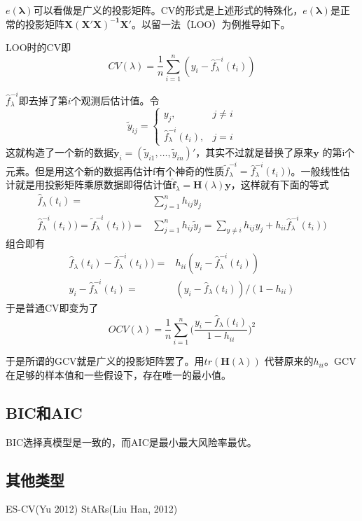 ﻿\documentclass[hyperref,12pt]{ctexart}
\begin{document}
$e(\boldsymbol{\lambda})$可以看做是广义的投影矩阵。CV的形式是上述形式的特殊化，$e(\boldsymbol{\lambda})$是正常的投影矩阵$\mathbf{X(X'X)^{-1}X'}$。以留一法（LOO）为例推导如下。

LOO时的CV即
\[
CV(\lambda) = \frac{1}{n}\sum_{i = 1}^n(y_i - \hat{f}_{\lambda}^{-i}(t_i))
\]

$\hat{f}_{\lambda}^{-i}$即去掉了第$i$个观测后估计值。令
\[
\tilde{y}_{ij} = \left\{\begin{array}{lr}
y_j, & j \neq i \\
\hat{f}_{\lambda}^{-i}(t_i), & j = i
\end{array}\right.
\]
这就构造了一个新的数据$\tilde{\mathbf{y}}_i = (\tilde{y}_{i1}, \ldots, \tilde{y}_{in})'$，其实不过就是替换了原来$\mathbf{y}$ 的第i个元素。但是用这个新的数据再估计f有个神奇的性质$\tilde{f}_{\lambda}^{-i} = \hat{f}_{\lambda}^{-i}(t_i))$。一般线性估计就是用投影矩阵乘原数据即得估计值$\hat{\mathbf{f}}_{\lambda} = \mathbf{H}(\lambda)\mathbf{y}$，这样就有下面的等式
\[
\begin{split}
\hat{f}_{\lambda}(t_i) = & \sum_{j = 1}^n h_{ij}y_j \\
\hat{f}_{\lambda}^{-i}(t_i)) =  \tilde{f}_{\lambda}^{-i}(t_i)) = & \sum_{j = 1}^n h_{ij} \tilde{y}_j = \sum_{y \neq i}h_{ij}y_j + h_{ii}\hat{f}_{\lambda}^{-i}(t_i))
\end{split}
\]
组合即有
\[
\begin{split}
\hat{f}_{\lambda}(t_i) - \hat{f}_{\lambda}^{-i}(t_i)) = & h_{ii}(y_i -\hat{f}_{\lambda}^{-i}(t_i) ) \\
y_i -\hat{f}_{\lambda}^{-i}(t_i) = & (y_i - \hat{f}_{\lambda}(t_i))/(1 - h_{ii})
\end{split}
\]
于是普通CV即变为了
\[
OCV(\lambda) = \frac{1}{n}\sum_{i = 1}^n \Big(\frac{y_i - \hat{f}_{\lambda}(t_i)}{1 - h_{ii}}\Big)^2
\]

于是所谓的GCV就是广义的投影矩阵罢了。用$tr(\mathbf{H}(\lambda))$ 代替原来的$h_{ii}$。GCV在足够的样本值和一些假设下，存在唯一的最小值。

\subsection{BIC和AIC}
BIC选择真模型是一致的，而AIC是最小最大风险率最优。


\subsection{其他类型}
ES-CV(Yu 2012)
StARs(Liu Han, 2012)
\end{document}

